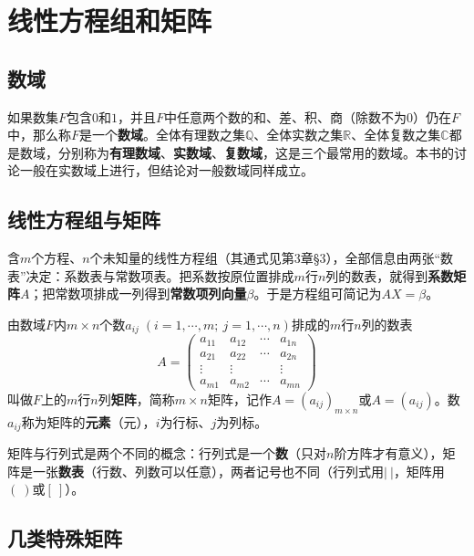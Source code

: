 \section{线性方程组和矩阵}

\subsection{数域}

如果数集$F$包含$0$和$1$，并且$F$中任意两个数的和、差、积、商（除数不为$0$）仍在$F$中，那么称$F$是一个\textbf{数域}。全体有理数之集$\mathbb{Q}$、全体实数之集$\mathbb{R}$、全体复数之集$\mathbb{C}$都是数域，分别称为\textbf{有理数域}、\textbf{实数域}、\textbf{复数域}，这是三个最常用的数域。本书的讨论一般在实数域上进行，但结论对一般数域同样成立。

\subsection{线性方程组与矩阵}

含$m$个方程、$n$个未知量的线性方程组（其通式见第3章§3），全部信息由两张“数表”决定：系数表与常数项表。把系数按原位置排成$m$行$n$列的数表，就得到\textbf{系数矩阵}$A$；把常数项排成一列得到\textbf{常数项列向量}$\beta$。于是方程组可简记为$AX=\beta$。

\begin{definition}
由数域$F$内$m\times n$个数$a_{ij}\;(i=1,\cdots,m;\ j=1,\cdots,n)$排成的$m$行$n$列的数表
\[
A=\begin{pmatrix}
a_{11}&a_{12}&\cdots&a_{1n}\\
a_{21}&a_{22}&\cdots&a_{2n}\\
\vdots&\vdots&&\vdots\\
a_{m1}&a_{m2}&\cdots&a_{mn}
\end{pmatrix}
\]
叫做$F$上的$m$行$n$列\textbf{矩阵}，简称$m\times n$矩阵，记作$A=(a_{ij})_{m\times n}$或$A=(a_{ij})$。数$a_{ij}$称为矩阵的\textbf{元素}（元），$i$为行标、$j$为列标。
\end{definition}

矩阵与行列式是两个不同的概念：行列式是一个\textbf{数}（只对$n$阶方阵才有意义），矩阵是一张\textbf{数表}（行数、列数可以任意），两者记号也不同（行列式用$|\ |$，矩阵用$(\ )$或$[\ ]$）。

\subsection{几类特殊矩阵}

